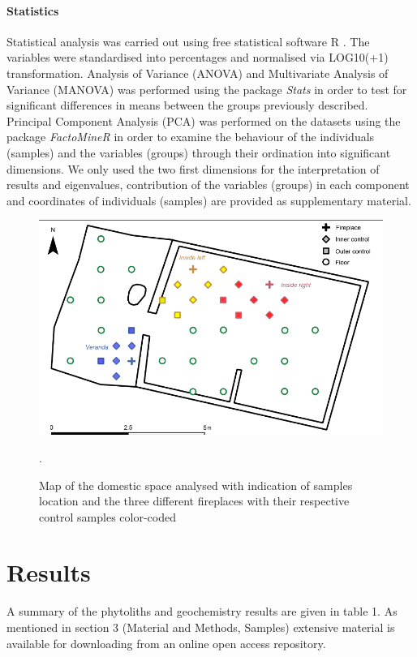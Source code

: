 \documentclass[authoryear,preprint,review,12pt]{elsarticle}
\begin{document}
\paragraph{Statistics}
Statistical analysis was carried out using free statistical software R \citep{R}. The variables were standardised into percentages and normalised via LOG10(+1) transformation.  Analysis of Variance (ANOVA) and Multivariate Analysis of Variance (MANOVA) was performed using the package \textit{Stats} \citep{R} in order to test for significant differences in means between the groups previously described. Principal Component Analysis (PCA) was performed on the datasets using the package \textit{FactoMineR} \citep{factominer} in order to examine the behaviour of the individuals (samples) and the variables (groups) through their ordination into significant dimensions. We only used the two first dimensions for the interpretation of results and eigenvalues, contribution of the variables (groups) in each component and coordinates of individuals (samples) are provided as supplementary material.

\begin{figure}[ht!]
  \begin{center}
    \includegraphics[width=15cm]{figures/figure_samples}
    \caption{Map of the domestic space analysed with indication of samples location and the three different fireplaces with their respective control samples color-coded}.
    \label{fig:samples}
  \end{center}
\end{figure}

\section{Results}
\label{sec:3}
A summary of the phytoliths and geochemistry results are given in table 1. As mentioned in section 3 (Material and Methods, Samples) extensive material is available for downloading from an online open access repository.
\end{document}
